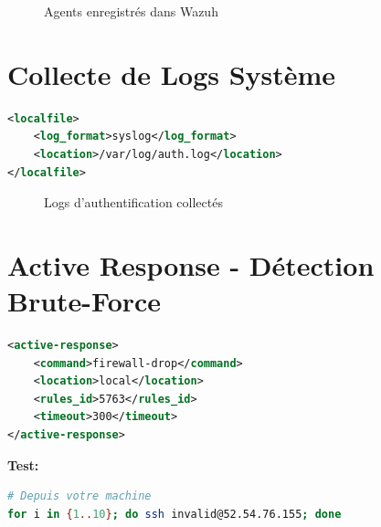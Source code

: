 \documentclass[12pt,a4paper]{article}
\begin{document}
\begin{figure}[H]
    \centering
    \caption{Agents enregistrés dans Wazuh}
    \label{fig:agents-registered}
\end{figure}

\section{Collecte de Logs Système}

\begin{lstlisting}[language=xml]
<localfile>
    <log_format>syslog</log_format>
    <location>/var/log/auth.log</location>
</localfile>
\end{lstlisting}

\begin{figure}[H]
    \centering
    \caption{Logs d'authentification collectés}
    \label{fig:auth-logs}
\end{figure}

\section{Active Response - Détection Brute-Force}

\begin{lstlisting}[language=xml]
<active-response>
    <command>firewall-drop</command>
    <location>local</location>
    <rules_id>5763</rules_id>
    <timeout>300</timeout>
</active-response>
\end{lstlisting}

\textbf{Test:}
\begin{lstlisting}[language=bash]
# Depuis votre machine
for i in {1..10}; do ssh invalid@52.54.76.155; done
\end{lstlisting}
\end{document}
